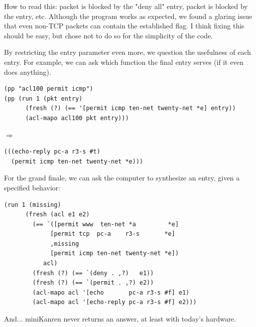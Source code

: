 How to read this: packet  is blocked by the "deny all" entry, packet  is blocked by the  entry, etc. Although the program works as expected, we found a glaring issue that even non-TCP packets can contain the established flag. I think fixing this should be easy, but chose not to do so for the simplicity of the code.

By restricting the entry parameter even more, we question the usefulness of each entry. For example, we can ask which function the final entry serves (if it even does anything).
\begin{lstlisting}
(pp "acl100 permit icmp")
(pp (run 1 (pkt entry)
      (fresh (?) (== '[permit icmp ten-net twenty-net *e] entry))
      (acl-mapo acl100 pkt entry)))
\end{lstlisting}
$\Rightarrow$
\begin{lstlisting}
(((echo-reply pc-a r3-s #t)
  (permit icmp ten-net twenty-net *e)))
\end{lstlisting}

For the grand finale, we can ask the computer to synthesize an entry, given a specified behavior:
\begin{lstlisting}
(run 1 (missing)
      (fresh (acl e1 e2)
        (== `([permit www  ten-net *a         *e]
             [permit tcp  pc-a    r3-s       *e]
             ,missing
             [permit icmp ten-net twenty-net *e])
           acl)
        (fresh (?) (== `(deny . ,?)   e1))
        (fresh (?) (== `(permit . ,?) e2))
        (acl-mapo acl '[echo       pc-a r3-s #f] e1)
        (acl-mapo acl '[echo-reply pc-a r3-s #f] e2)))
\end{lstlisting}
And... miniKanren never returns an answer, at least with today's hardware.
